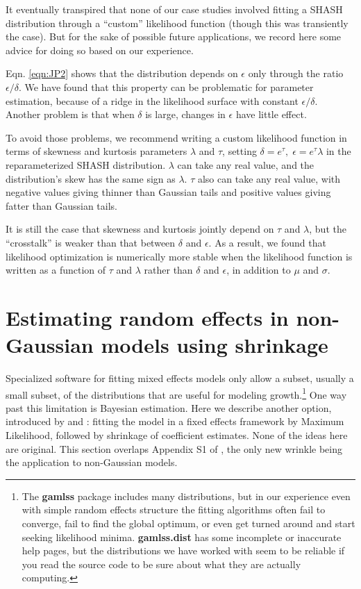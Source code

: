 \documentclass[12pt]{article}
\begin{document}
It eventually transpired that none of our case studies involved fitting a SHASH distribution through a ``custom'' likelihood 
function (though this was transiently the case). But for the sake of possible future applications, we record here some 
advice for doing so based on our experience. 

Eqn. \eqref{eqn:JP2} shows that the distribution depends on $\epsilon$ only through the ratio $\epsilon/\delta$. We have found
that this property can be problematic for parameter estimation, because of a ridge in the likelihood surface with constant  
$\epsilon/\delta$. Another problem is that when $\delta$ is large, changes in $\epsilon$ have little effect. 

To avoid those problems, we recommend writing a custom likelihood function in terms of 
skewness and kurtosis parameters $\lambda$ and $\tau$, setting $\delta = e^{\tau}, \; \epsilon =  e^{\tau} \lambda$ in the 
reparameterized SHASH distribution. $\lambda$ can take any real value, and the distribution's skew has the same sign as $\lambda$. 
$\tau$ also can take any real value, with negative values giving thinner than Gaussian tails 
and positive values giving fatter than Gaussian tails. 

It is still the case that skewness and kurtosis jointly depend on $\tau$ and $\lambda$, but the
``crosstalk'' is weaker than that between $\delta$ and $\epsilon$. 
As a result, we found that likelihood optimization is numerically more stable when the likelihood function is 
written as a function of $\tau$ and $\lambda$ rather than $\delta$ and $\epsilon$, in addition to $\mu$ and $\sigma$.  

\section{Estimating random effects in non-Gaussian models using shrinkage}
\label{sec:shrinkageFits}
Specialized software for fitting mixed effects models only allow a subset, usually a small subset, of the distributions that 
are useful for modeling growth.\footnote{The \textbf{gamlss} package includes many distributions, but in our experience even with 
simple random effects structure the fitting algorithms often fail to converge, fail to find the global optimum, or   
even get turned around and start seeking likelihood minima. 
\textbf{gamlss.dist} has some incomplete or inaccurate help pages, 
but the distributions we have worked with seem to be reliable if you read the source code to be sure about what they are
actually computing.} One way past this limitation is Bayesian estimation. Here we describe another option, 
introduced by \citet{link-nichols-1994} and \citet{gould-nichols-1998}: 
fitting the model in a fixed effects framework by Maximum Likelihood, followed by shrinkage of coefficient estimates. 
None of the ideas here are original. This section overlaps Appendix S1 of \citet{metcalf-etal-2015}, the only new wrinkle
being the application to non-Gaussian models.
\end{document}
